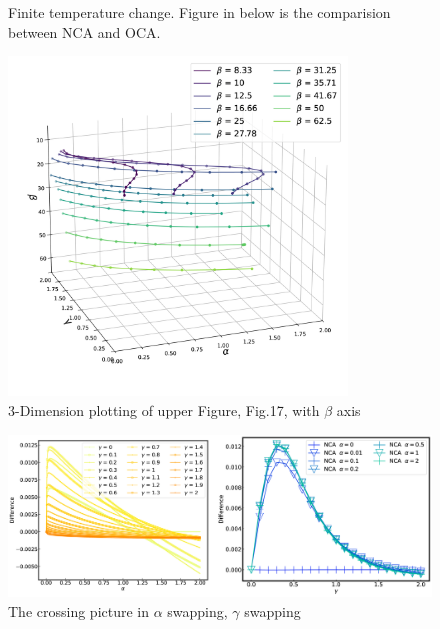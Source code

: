\documentclass{article}[12pt]
\begin{document}
\begin{spacing}{1.5}
\begin{figure}[htbp]
  \caption{Finite temperature change. Figure in below is the comparision between NCA and OCA.}
\end{figure}
\begin{figure}[htbp]
  \centerline{\includegraphics[width=9cm]{TexFigure/3dplot_Ns3_proj_n (0).png}}
  \caption{3-Dimension plotting of upper Figure, Fig.17,  with $\beta$ axis}
\end{figure}

\begin{figure}[htbp]
  \centerline{\includegraphics[width=12cm]{TexFigure/swap_fig.png}}
  \caption{The crossing picture in $\alpha$ swapping, $\gamma$ swapping}
\end{figure}
\pagebreak

\end{spacing}
\end{document}
